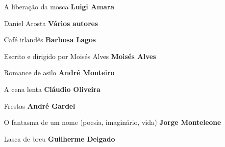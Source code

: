 \begin{multicols}{2}
\begin{enumerate}
{\item A liberação da mosca \textbf{Luigi Amara}
\item Daniel Acosta \textbf{Vários autores}
\item Café irlandês \textbf{Barbosa Lagos}
\item Escrito e dirigido por Moisés Alves \textbf{Moisés Alves}
\item Romance de asilo \textbf{André Monteiro}
\item A cena lenta \textbf{Cláudio Oliveira}
\item Frestas \textbf{André Gardel}
\item O fantasma de um nome (poesia, imaginário, vida) \textbf{Jorge Monteleone}
\item Lasca de breu \textbf{Guilherme Delgado}
}
\end{enumerate}
\end{multicols}

\pagebreak

